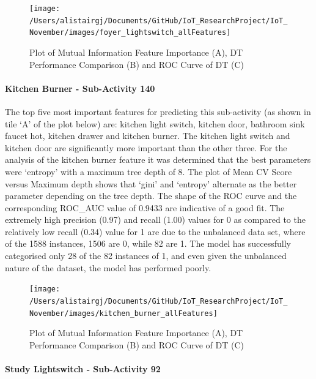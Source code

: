 \documentclass[11pt,]{article}
\let\oldparagraph\paragraph
\renewcommand{\paragraph}[1]{\oldparagraph{#1}\mbox{}}
\begin{document}
\begin{figure}[H]

{\centering \texttt{[image: /Users/alistairgj/Documents/GitHub/IoT\_ResearchProject/IoT\_November/images/foyer\_lightswitch\_allFeatures]} 

}

\caption{Plot of Mutual Information Feature Importance (A), DT Performance Comparison (B) and ROC Curve of DT (C)}\label{fig:unnamed-chunk-15}
\end{figure}

\hypertarget{kitchen-burner---sub-activity-140-1}{%
\paragraph{Kitchen Burner - Sub-Activity
140}\label{kitchen-burner---sub-activity-140-1}}

The top five most important features for predicting this sub-activity
(as shown in tile `A' of the plot below) are: kitchen light switch,
kitchen door, bathroom sink faucet hot, kitchen drawer and kitchen
burner. The kitchen light switch and kitchen door are significantly more
important than the other three. For the analysis of the kitchen burner
feature it was determined that the best parameters were `entropy' with a
maximum tree depth of 8. The plot of Mean CV Score versus Maximum depth
shows that `gini' and `entropy' alternate as the better parameter
depending on the tree depth. The shape of the ROC curve and the
corresponding ROC\_AUC value of 0.9433 are indicative of a good fit. The
extremely high precision (0.97) and recall (1.00) values for 0 as
compared to the relatively low recall (0.34) value for 1 are due to the
unbalanced data set, where of the 1588 instances, 1506 are 0, while 82
are 1. The model has successfully categorised only 28 of the 82
instances of 1, and even given the unbalanced nature of the dataset, the
model has performed poorly.

\begin{figure}[H]

{\centering \texttt{[image: /Users/alistairgj/Documents/GitHub/IoT\_ResearchProject/IoT\_November/images/kitchen\_burner\_allFeatures]} 

}

\caption{Plot of Mutual Information Feature Importance (A), DT Performance Comparison (B) and ROC Curve of DT (C)}\label{fig:unnamed-chunk-16}
\end{figure}

\hypertarget{study-lightswitch---sub-activity-92-1}{%
\paragraph{Study Lightswitch - Sub-Activity
92}\label{study-lightswitch---sub-activity-92-1}}
\end{document}
